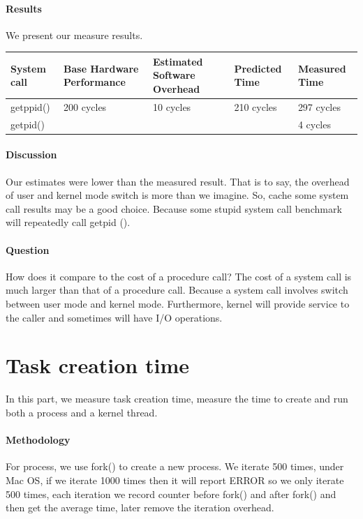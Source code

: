 \paragraph{Results}
We present our measure results.

\begin{center}
\begin{tabular}{| p{3cm} | p{3cm} | p{3cm} | p{3cm} | p{3cm} |}
System call  & Base Hardware Performance  & Estimated Software Overhead  & Predicted Time  & Measured Time   \\
\hline
getppid() & 200 cycles& 10 cycles& 210 cycles& 297 cycles \\
getpid() & ~ & ~ & ~ & 4 cycles \\
\end{tabular}
\end{center}

\paragraph{Discussion}
Our estimates were lower than the measured result. That is to say, the overhead of user and kernel mode switch is more than we imagine. So, cache some system call results may be a good choice. Because some stupid system call benchmark will repeatedly call getpid ().

\paragraph{Question} How does it compare to the cost of a procedure call? The cost of a system call is much larger than that of a procedure call. Because a system call involves switch between user mode and kernel mode. Furthermore, kernel will provide service to the caller and sometimes will have I/O operations.

\section{Task creation time}
In this part, we measure task creation time, measure the time to create and run both a process and a kernel thread.

\paragraph{Methodology}
For process, we use fork() to create a new process. We iterate 500 times, under Mac OS, if we iterate 1000 times then it will report ERROR so we only iterate 500 times, each iteration we record counter before fork() and after fork() and then get the average time, later remove the iteration overhead.

